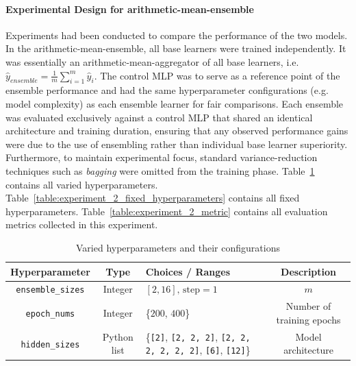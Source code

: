 \paragraph{Experimental Design for arithmetic-mean-ensemble}
Experiments had been conducted to compare the performance of the two models. In the arithmetic-mean-ensemble, all base learners were trained independently. It was essentially an arithmetic-mean-aggregator of all base learners, i.e. $\hat{y}_{ensemble} = \frac{1}{m} \sum_{i=1}^{m} \hat{y}_i$. The control MLP was to serve as a reference point of the ensemble performance and had the same hyperparameter configurations (e.g. model complexity) as each ensemble learner for fair comparisons. Each ensemble was evaluated exclusively against a control MLP that shared an identical architecture and training duration, ensuring that any observed performance gains were due to the use of ensembling rather than individual base learner superiority. Furthermore, to maintain experimental focus, standard variance-reduction techniques such as \textit{bagging} were omitted from the training phase. Table~\ref{table:experiment_2_varied_hyperparameters} contains all varied hyperparameters. Table~\ref{table:experiment_2_fixed_hyperparameters} contains all fixed hyperparameters. Table~\ref{table:experiment_2_metric} contains all evaluation metrics collected in this experiment. 

\begin{table}[H]
    \centering
    \begin{tabular}{|c|c|p{5cm}|c|}
        \hline
        Hyperparameter & Type & Choices / Ranges & Description \\
        \hline
        \small\texttt{ensemble\_sizes} & Integer & $[2, 16]\text{, step}=1$ & $m$ \\
        \hline
        \small\texttt{epoch\_nums} & Integer & \{$200$, $400$\} & Number of training epochs \\
        \hline
        \small\texttt{hidden\_sizes} & Python list & \{\texttt{[2]}, \texttt{[2, 2, 2]}, \texttt{[2, 2, 2, 2, 2, 2]}, \texttt{[6]}, \texttt{[12]}\} & Model architecture \\
        \hline
    \end{tabular}
    \caption{Varied hyperparameters and their configurations}
    \label{table:experiment_2_varied_hyperparameters}
\end{table}

